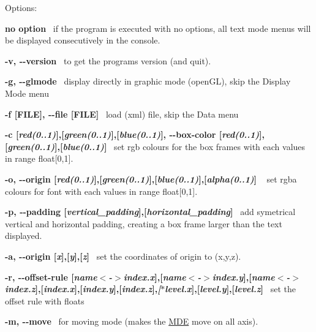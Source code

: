 Options\+:


\begin{DoxyItemize}
\item {\bfseries no option}~\newline
 if the program is executed with no options, all text mode menus will be displayed consecutively in the console. 
\item {\bfseries -\/v, -\/-\/version}~\newline
 to get the program\textquotesingle{}s version (and quit). 
\item {\bfseries -\/g, -\/-\/glmode}~\newline
 display directly in graphic mode (open\+GL), skip the Display Mode menu 
\item {\bfseries -\/f \mbox{[}F\+I\+LE\mbox{]}, -\/-\/file \mbox{[}F\+I\+LE\mbox{]}}~\newline
 load (xml) file, skip the Data menu 
\item {\bfseries -\/c \mbox{[}{\itshape red(0..1)}\mbox{]},\mbox{[}{\itshape green(0..1)}\mbox{]},\mbox{[}{\itshape blue(0..1)}\mbox{]}, -\/-\/box-\/color \mbox{[}{\itshape red(0..1)}\mbox{]},\mbox{[}{\itshape green(0..1)}\mbox{]},\mbox{[}{\itshape blue(0..1)}\mbox{]}}~\newline
 set rgb colours for the box frames with each values in range float\mbox{[}0,1\mbox{]}. 
\item {\bfseries -\/o, -\/-\/origin \mbox{[}{\itshape red(0..1)}\mbox{]},\mbox{[}{\itshape green(0..1)}\mbox{]},\mbox{[}{\itshape blue(0..1)}\mbox{]},\mbox{[}{\itshape alpha(0..1)}\mbox{]} }~\newline
 set rgba colours for font with each values in range float\mbox{[}0,1\mbox{]}. 
\item {\bfseries -\/p, -\/-\/padding \mbox{[}{\itshape vertical\+\_\+padding}\mbox{]},\mbox{[}{\itshape horizontal\+\_\+padding}\mbox{]}}~\newline
 add symetrical vertical and horizontal padding, creating a box frame larger than the text displayed. 
\item {\bfseries -\/a, -\/-\/origin \mbox{[}{\itshape x}\mbox{]},\mbox{[}{\itshape y}\mbox{]},\mbox{[}{\itshape z}\mbox{]}}~\newline
 set the coordinates of origin to (x,y,z). 
\item {\bfseries -\/r, -\/-\/offset-\/rule \mbox{[}{\itshape name$<$-\/$>$index.\+x}\mbox{]},\mbox{[}{\itshape name$<$-\/$>$index.\+y}\mbox{]},\mbox{[}{\itshape name$<$-\/$>$index.\+z}\mbox{]},\mbox{[}{\itshape index.\+x}\mbox{]},\mbox{[}{\itshape index.\+y}\mbox{]},\mbox{[}{\itshape index.\+z}\mbox{]},{\itshape \mbox{[}$\ast$level.x}\mbox{]},\mbox{[}{\itshape level.\+y}\mbox{]},\mbox{[}{\itshape level.\+z}\mbox{]}}~\newline
 set the offset rule with floats 
\item {\bfseries -\/m, -\/-\/move}~\newline
 for moving mode (makes the \hyperlink{classMDE}{M\+DE} move on all axis). 
\end{DoxyItemize}